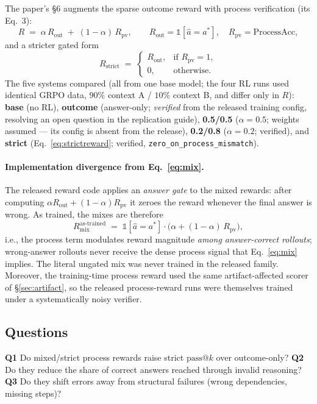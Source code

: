 \documentclass[11pt]{article}
\makeatletter
\newcommand{\passk}[1]{\ensuremath{\mathrm{pass}@#1}}
\newcommand{\Rout}{\ensuremath{R_{\mathrm{out}}}}
\newcommand{\Rpv}{\ensuremath{R_{\mathrm{pv}}}}
\newcommand{\ind}[1]{\ensuremath{\mathbb{1}\!\left[#1\right]}}
\makeatother
\begin{document}
The paper's \S6 augments the sparse outcome reward with process verification
(its Eq.~3):
\begin{equation}
R \;=\; \alpha\,\Rout \;+\; (1-\alpha)\,\Rpv,
\qquad \Rout = \ind{\hat a = a^{*}}, \quad \Rpv = \mathrm{ProcessAcc},
\label{eq:mix}
\end{equation}
and a stricter gated form
\begin{equation}
R_{\mathrm{strict}} \;=\;
\begin{cases}
\Rout, & \text{if } \Rpv = 1,\\
0, & \text{otherwise.}
\end{cases}
\label{eq:strictreward}
\end{equation}
The five systems compared (all from one base model; the four RL runs used identical
GRPO data, $90\%$ context A / $10\%$ context B, and differ only in $R$):
\textbf{base} (no RL), \textbf{outcome} (answer-only; \emph{verified} from the
released training config, resolving an open question in the replication guide),
\textbf{0.5/0.5} ($\alpha{=}0.5$; weights assumed --- its config is absent from the
release), \textbf{0.2/0.8} ($\alpha{=}0.2$; verified), and \textbf{strict}
(Eq.~\ref{eq:strictreward}; verified, \texttt{zero\_on\_process\_mismatch}).

\paragraph{Implementation divergence from Eq.~\eqref{eq:mix}.} The released reward
code applies an \emph{answer gate} to the mixed rewards: after computing
$\alpha \Rout + (1-\alpha)\Rpv$ it zeroes the reward whenever the final answer is
wrong. As trained, the mixes are therefore
\begin{equation}
R_{\mathrm{mix}}^{\mathrm{as\text{-}trained}}
\;=\; \ind{\hat a = a^{*}} \cdot \big(\alpha + (1-\alpha)\,\Rpv\big),
\label{eq:gated}
\end{equation}
i.e., the process term modulates reward magnitude \emph{among answer-correct
rollouts}; wrong-answer rollouts never receive the dense process signal that
Eq.~\eqref{eq:mix} implies. The literal ungated mix was never trained in the released
family. Moreover, the training-time process reward used the same artifact-affected
scorer of \S\ref{sec:artifact}, so the released process-reward runs were themselves
trained under a systematically noisy verifier.

\subsection{Questions}
\textbf{Q1} Do mixed/strict process rewards raise strict \passk{k} over outcome-only?
\textbf{Q2} Do they reduce the share of correct answers reached through invalid
reasoning? \textbf{Q3} Do they shift errors away from structural failures (wrong
dependencies, missing steps)?
\end{document}
